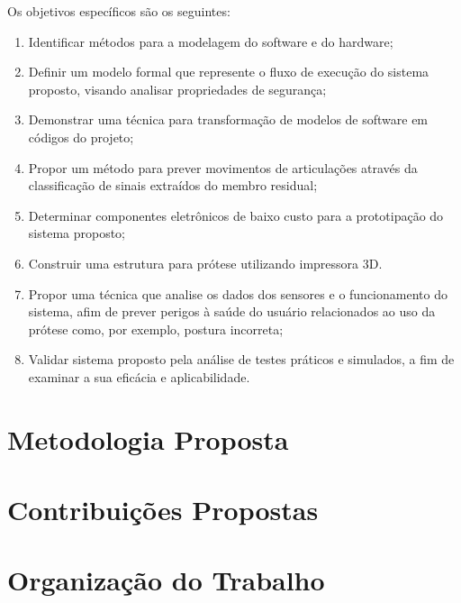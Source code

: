 
Os objetivos específicos são os seguintes:
\begin{enumerate}
  \item Identificar métodos para a modelagem do software e do hardware;
  \item Definir um modelo formal que represente o fluxo de execução do sistema proposto, visando analisar propriedades de segurança;
  \item Demonstrar uma técnica para transformação de modelos de software em códigos do projeto;
  \item Propor um método para prever movimentos de articulações através da classificação de sinais extraídos do membro residual;
  \item Determinar componentes eletrônicos de baixo custo para a prototipação do sistema proposto;
  \item Construir uma estrutura para prótese utilizando impressora 3D.
  \item Propor uma técnica que analise os dados dos sensores e o funcionamento do sistema, afim de prever perigos à saúde do usuário relacionados ao uso da prótese como, por exemplo, postura incorreta;
  \item Validar sistema proposto pela análise de testes práticos e simulados, a fim de examinar a sua eficácia e aplicabilidade.
\end{enumerate}

\section{Metodologia Proposta}
\label{sec:metodologia}

\section{Contribuições Propostas}
\label{sec:contribuicoes}

\section{Organização do Trabalho}
\label{sec:organizacao}
